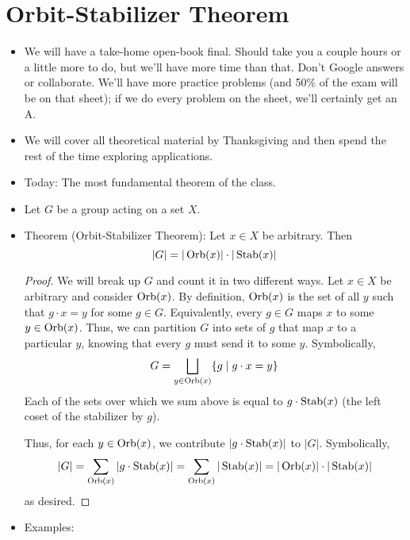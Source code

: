 \documentclass[../notes.tex]{subfiles}
\begin{document}
\section{Orbit-Stabilizer Theorem}
\begin{itemize}
    \item {}We will have a take-home open-book final. Should take you a couple hours or a little more to do, but we'll have more time than that. Don't Google answers or collaborate. We'll have more practice problems (and 50\% of the exam will be on that sheet); if we do every problem on the sheet, we'll certainly get an A.
    \item We will cover all theoretical material by Thanksgiving and then spend the rest of the time exploring applications.
    \item Today: The most fundamental theorem of the class.
    \item Let $G$ be a group acting on a set $X$.
    \item Theorem (Orbit-Stabilizer Theorem): Let $x\in X$ be arbitrary. Then
    \begin{equation*}
        |G| = |\operatorname{Orb}(x)|\cdot|\operatorname{Stab}(x)|
    \end{equation*}
    \begin{proof}
        We will break up $G$ and count it in two different ways. Let $x\in X$ be arbitrary and consider $\operatorname{Orb}(x)$. By definition, $\operatorname{Orb}(x)$ is the set of all $y$ such that $g\cdot x=y$ for some $g\in G$. Equivalently, every $g\in G$ maps $x$ to some $y\in\operatorname{Orb}(x)$. Thus, we can partition $G$ into sets of $g$ that map $x$ to a particular $y$, knowing that every $g$ must send it to some $y$. Symbolically,
        \begin{equation*}
            G = \bigsqcup_{y\in\operatorname{Orb}(x)}\{g\mid g\cdot x=y\}
        \end{equation*}
        Each of the sets over which we sum above is equal to $g\cdot\operatorname{Stab}(x)$ (the left coset of the stabilizer by $g$).\par
        Thus, for each $y\in\operatorname{Orb}(x)$, we contribute $|g\cdot\operatorname{Stab}(x)|$ to $|G|$. Symbolically,
        \begin{equation*}
            |G| = \sum_{\operatorname{Orb}(x)}|g\cdot\operatorname{Stab}(x)|
            = \sum_{\operatorname{Orb}(x)}|\operatorname{Stab}(x)|
            = |\operatorname{Orb}(x)|\cdot|\operatorname{Stab}(x)|
        \end{equation*}
        as desired.
    \end{proof}
    \item Examples:
    \begin{itemize}

\end{itemize}
\end{itemize}
\end{document}
